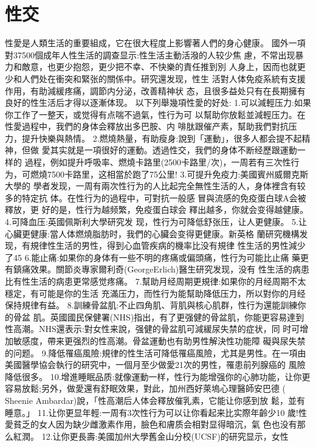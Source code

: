 \documentclass[12pt,UTF8]{ctexbook}
\begin{document}
\part{性交}

性愛是人類生活的重要組成，它在很大程度上影響著人們的身心健康。
國外一項對37500個成年人性生活的調查显示:性生活主動活潑的人较少焦
慮，不常出现暴力和敵意，也更少抱怨，更少把不幸、不快樂的責任推到別
人身上，因而也就更少和人們处在衝突和緊张的關係中。研究還发现，性生
活對人体免疫系統有支援作用，有助減緩疼痛，調節内分泌，改善精神状
态，且很多益处只有在長期擁有良好的性生活后才得以逐漸体现。
以下列舉幾項性愛的好处:
1.可以減輕压力:如果你工作了一整天，或觉得有点喘不過氣，性行为可
以幫助你放鬆並減輕压力。在性愛過程中，我們的身体会釋放出多巴胺、内
啡肽跟催产素，幫助我們對抗压力，提升快樂與熱情。
2.燃燒熱量，有助瘦身:說到「運動」，很多人都会提不起精神，但做
愛其实就是一項很好的運動。透過性交，我們的身体不断经歷跟運動一样的
過程，例如提升呼吸率、燃燒卡路里(2500卡路里/次)，一周若有三次性行
为，可燃燒7500卡路里，这相當於跑了75公里!
3.可提升免疫力:美國賓州威爾克斯大學的
學者发现，一周有兩次性行为的人比起完全無性生活的人，身体裡含有较多的特定抗
体。在性行为的過程中，可對抗一般感
冒與流感的免疫蛋白球A会被釋放，更
好的是，性行为越频繁，免疫蛋白球会
釋出越多，你就会变得越健康。
4.可降血压:英國佩斯利大學研究发
现，性行为可降低舒张压，让人更健康。
5.让心臟更健康:當人体燃燒脂肪时，我們的心臟会变得更健康。新英格
蘭研究機構发现，有規律性生活的男性，得到心血管疾病的機率比没有規律
性生活的男性減少了45%
6.能止痛:如果你的身体有一些不明的疼痛或偏頭痛，性行为可能比止痛
藥更有鎮痛效果。關節炎專家爾利奇(GeorgeErlich)醫生研究发现，没有
性生活的病患比有性生活的病患更常感觉疼痛。
7.幫助月经周期更規律:如果你的月经周期不太穩定，有可能是你的生活
充滿压力，而性行为能幫助降低压力，所以對你的月经保持規律有益。
8.訓練骨盆肌:不止四角肌、背肌與核心肌群，性行为還能訓練你的骨盆
肌。英國國民保健署(NHS)指出，有了更强健的骨盆肌，你能更容易達到
性高潮。NHS還表示:對女性来說，强健的骨盆肌可減緩尿失禁的症状，同
时可增加敏感度，帶来更强烈的性高潮。骨盆運動也有助男性解決性功能障
礙與尿失禁的问题。
9.降低罹癌風險:規律的性生活可降低罹癌風險，尤其是男性。在一項由
美國醫學協会執行的研究中，一個月至少做愛21次的男性，罹患前列腺癌的
風險降低很多。
10.增進睡眠品质:就像運動一样，性行为能增强你的心肺功能，让你更
容易放鬆;另外，做愛還有舒眠效果，對此，加州西好萊塢心理醫師安巴德
( Sheenie Ambardar)說，「性高潮后人体会釋放催乳素，它能让你感到放
鬆，並有睡意。」
11.让你更显年輕:一周有3次性行为可以让你看起来比实際年齡少10
歲!性愛貧乏的女人因为缺少雌激素作用，臉色和膚质会相對显得暗沉，氣
色也没有那么紅潤。
12.让你更長壽:美國加州大學舊金山分校(UCSF)的研究显示，女性
\end{document}
